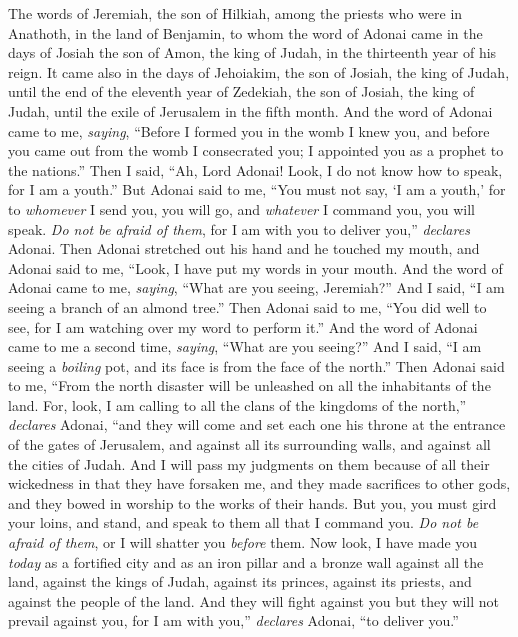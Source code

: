 
\begin{biblechapter} %
 The words of Jeremiah, the son of Hilkiah, among the priests who were in Anathoth, in the land of Benjamin,
\verse to whom the word of Adonai came in the days of Josiah the son of Amon, the king of Judah, in the thirteenth year of his reign.
\verse It came also in the days of Jehoiakim, the son of Josiah, the king of Judah, until the end of the eleventh year of Zedekiah, the son of Josiah, the king of Judah, until the exile of Jerusalem in the fifth month.
\verse And the word of Adonai came to me, \textit{saying},
\verse “Before I formed you in the womb I knew you, 
and before you came out from the womb I consecrated you; 
I appointed you as a prophet to the nations.”
\verse Then I said, “Ah, Lord Adonai! Look, I do not know how to speak, for I am a youth.”
\verse But Adonai said to me, “You must not say, ‘I am a youth,’ for to \textit{whomever} I send you, you will go, and \textit{whatever} I command you, you will speak.
\verse \textit{Do not be afraid of them}, for I am with you to deliver you,” \textit{declares} Adonai.
\verse Then Adonai stretched out his hand and he touched my mouth, and Adonai said to me,
\verse “Look, I have put my words in your mouth.
 And the word of Adonai came to me, \textit{saying}, “What are you seeing, Jeremiah?” And I said, “I am seeing a branch of an almond tree.”
\verse Then Adonai said to me, “You did well to see, for I am watching over my word to perform it.”
\verse And the word of Adonai came to me a second time, \textit{saying}, “What are you seeing?” And I said, “I am seeing a \textit{boiling} pot, and its face is from the face of the north.”
\verse Then Adonai said to me, “From the north disaster will be unleashed on all the inhabitants of the land.
\verse For, look, I am calling to all the clans of the kingdoms of the north,” \textit{declares} Adonai, “and they will come and set each one his throne at the entrance of the gates of Jerusalem, and against all its surrounding walls, and against all the cities of Judah.
\verse And I will pass my judgments on them because of all their wickedness in that they have forsaken me, and they made sacrifices to other gods, and they bowed in worship to the works of their hands.
\verse But you, you must gird your loins, and stand, and speak to them all that I command you. \textit{Do not be afraid of them}, or I will shatter you \textit{before} them.
\verse Now look, I have made you \textit{today} as a fortified city and as an iron pillar and a bronze wall against all the land, against the kings of Judah, against its princes, against its priests, and against the people of the land.
\verse And they will fight against you but they will not prevail against you, for I am with you,” \textit{declares} Adonai, “to deliver you.”
\end{biblechapter}

